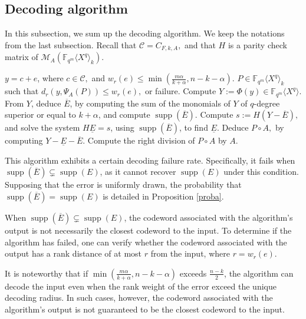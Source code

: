 \documentclass{article}
\newcommand{\Fq}{\mathbb{F}_q}
\newcommand{\QP}{\mathbb{F}_{q^m} \langle X^q \rangle}
\newcommand{\supp}{\operatorname{supp}}
\theoremstyle{definition}
\begin{document}
\subsection{Decoding algorithm}

In this subsection, we sum up the decoding algorithm.
\noindent We keep the notations from the last subsection.
Recall that $\mathcal{C}= C_{F,k,A}, $  and that $H$ is a parity check matrix of $\mathcal{M}_A(\QP_{k})$.

\begin{algorithm}[htbp]
      \caption{Decoding algorithm in the case where the moduli polynomials have coefficients in $\Fq$.}
      \begin{algorithmic}[1]
            \REQUIRE $ y =  c +  e$, where $c \in \mathcal{C},$ and $w_r(e) \leqslant \min( \frac{m\alpha}{k+\alpha },n-k-\alpha).$
            \ENSURE  $P \in \QP_{k}$ such that $d_r(y,\Psi_A (P))\leqslant w_r(e),$ or failure.
            \STATE Compute $Y := \Phi(y) \in \QP$.
            \STATE From $Y$, deduce $\overline{E}$, by computing the sum of the monomials of $Y$ of $q$-degree superior or equal to $k+\alpha$, and compute $\supp(\overline{E}).$
            \STATE  Compute $s:= H(Y-\overline{E}),$ and solve the system $H\underline{E}=s$, using $\supp(\overline{E})$, to find $\underline{E}$.
            \STATE Deduce $P\circ A,$ by computing $Y-\underline{E}-\overline{E}$.
            \STATE Compute the right division of $P\circ A$ by $A.$
      \end{algorithmic}
\end{algorithm}

This algorithm exhibits a certain decoding failure rate. Specifically, it fails when $\supp(\overline{E}) \subsetneq \supp(E)$, as it cannot recover $\supp(E)$ under this condition. Supposing that the error is uniformly drawn, \color{black}the probability that $\supp(\overline{E}) = \supp(E)$ is detailed in Proposition \ref{proba}.

When $\supp(\overline{E}) \subsetneq \supp(E)$, the codeword associated with the algorithm's output is not necessarily the closest codeword to the input. To determine if the algorithm has failed, one can verify whether the codeword associated with the output has a rank distance of at most $r$ from the input, where $r = w_r(e)$.

It is noteworthy that if $\min\left(\frac{m\alpha}{k+\alpha}, n-k-\alpha\right)$ exceeds $\frac{n-k}{2}$, the algorithm can decode the input even when the rank weight of the error exceed the unique decoding radius. In such cases, however, the codeword associated with the algorithm's output is not guaranteed to be the closest codeword to the input.
\end{document}

